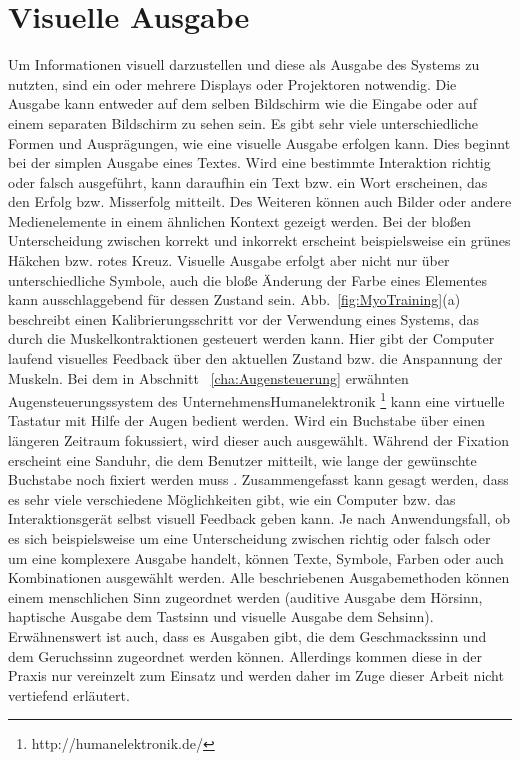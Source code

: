 \section{Visuelle Ausgabe}
Um Informationen visuell darzustellen und diese als Ausgabe des Systems zu nutzten, sind ein oder mehrere Displays oder Projektoren notwendig. Die Ausgabe kann entweder auf dem selben Bildschirm wie die Eingabe oder auf einem separaten Bildschirm zu sehen sein.
\newline \newline
Es gibt sehr viele unterschiedliche Formen und Ausprägungen, wie eine visuelle Ausgabe erfolgen kann. Dies beginnt bei der simplen Ausgabe eines Textes. Wird eine bestimmte Interaktion richtig oder falsch ausgeführt, kann daraufhin ein Text bzw. ein Wort erscheinen, das den Erfolg bzw. Misserfolg mitteilt. Des Weiteren können auch Bilder oder andere Medienelemente in einem ähnlichen Kontext gezeigt werden. Bei der bloßen Unterscheidung zwischen korrekt und inkorrekt erscheint beispielsweise ein grünes Häkchen bzw. rotes Kreuz. Visuelle Ausgabe erfolgt aber nicht nur über unterschiedliche Symbole, auch die bloße Änderung der Farbe eines Elementes kann ausschlaggebend für dessen Zustand sein.
\newline \newline
Abb.~\ref{fig:MyoTraining}(a) beschreibt einen Kalibrierungsschritt vor der Verwendung eines Systems, das durch die Muskelkontraktionen gesteuert werden kann. Hier gibt der Computer laufend visuelles Feedback über den aktuellen Zustand bzw. die Anspannung der Muskeln.
\newline \newline
Bei dem in Abschnitt ~\ref{cha:Augensteuerung} erwähnten Augensteuerungssystem des Unternehmens\linebreak Humanelektronik%
\footnote{http://humanelektronik.de/}
%
kann eine virtuelle Tastatur mit Hilfe der Augen bedient werden. Wird ein Buchstabe über einen längeren Zeitraum fokussiert, wird dieser auch ausgewählt. Während der Fixation erscheint eine Sanduhr, die dem Benutzer mitteilt, wie lange der gewünschte Buchstabe noch fixiert werden muss \cite{SEETECH}. 
%
\newline \newline
Zusammengefasst kann gesagt werden, dass es sehr viele verschiedene Möglichkeiten gibt, wie ein Computer bzw. das Interaktionsgerät selbst visuell Feedback geben kann. Je nach Anwendungsfall, ob es sich beispielsweise um eine Unterscheidung zwischen richtig oder falsch oder um eine komplexere Ausgabe handelt, können Texte, Symbole, Farben oder auch Kombinationen ausgewählt werden.
%
%
\newline \newline \newline
Alle beschriebenen Ausgabemethoden können einem menschlichen Sinn zugeordnet werden (auditive Ausgabe dem Hörsinn, haptische Ausgabe dem Tastsinn und visuelle Ausgabe dem Sehsinn). Erwähnenswert ist auch, dass es Ausgaben gibt, die dem Geschmackssinn und dem Geruchssinn zugeordnet werden können. Allerdings kommen diese in der Praxis nur vereinzelt zum Einsatz und werden daher im Zuge dieser Arbeit nicht vertiefend erläutert.


